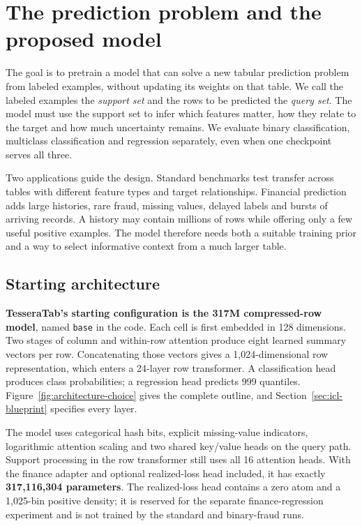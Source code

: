 \documentclass[11pt]{article}
\begin{document}
\section{The prediction problem and the proposed model}
\label{sec:decision}

The goal is to pretrain a model that can solve a new tabular prediction problem from labeled examples, without updating its weights on that table. We call the labeled examples the \emph{support set} and the rows to be predicted the \emph{query set}. The model must use the support set to infer which features matter, how they relate to the target and how much uncertainty remains. We evaluate binary classification, multiclass classification and regression separately, even when one checkpoint serves all three.

Two applications guide the design. Standard benchmarks test transfer across tables with different feature types and target relationships. Financial prediction adds large histories, rare fraud, missing values, delayed labels and bursts of arriving records. A history may contain millions of rows while offering only a few useful positive examples. The model therefore needs both a suitable training prior and a way to select informative context from a much larger table.

\subsection{Starting architecture}
\label{sec:main-candidate}

\textbf{TesseraTab's starting configuration is the 317M compressed-row model}, named \texttt{base} in the code. Each cell is first embedded in 128 dimensions. Two stages of column and within-row attention produce eight learned summary vectors per row. Concatenating those vectors gives a 1,024-dimensional row representation, which enters a 24-layer row transformer. A classification head produces class probabilities; a regression head predicts 999 quantiles. Figure~\ref{fig:architecture-choice} gives the complete outline, and Section~\ref{sec:icl-blueprint} specifies every layer.

The model uses categorical hash bits, explicit missing-value indicators, logarithmic attention scaling and two shared key/value heads on the query path. Support processing in the row transformer still uses all 16 attention heads. With the finance adapter and optional realized-loss head included, it has exactly \textbf{317,116,304 parameters}. The realized-loss head contains a zero atom and a 1,025-bin positive density; it is reserved for the separate finance-regression experiment and is not trained by the standard and binary-fraud runs.
\end{document}
